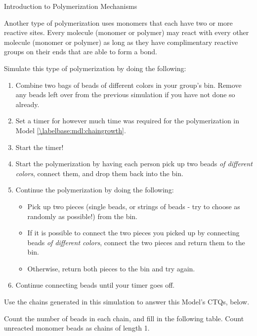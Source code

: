 \begin{activity}{Introduction to Polymerization Mechanisms}
\begin{model}
	Another type of polymerization uses monomers that each have two or more reactive sites.  Every molecule (monomer or polymer) may react with every other molecule (monomer or polymer) as long as they have complimentary reactive groups on their ends that are able to form a bond.
	
	Simulate this type of polymerization by doing the following:
	\begin{enumerate}
		\item Combine two bags of beads of different colors in your group's bin.  Remove any beads left over from the previous simulation if you have not done so already.
		\item Set a timer for however much time was required for the polymerization in Model \ref{\labelbase:mdl:chaingrowth}.
		\item Start the timer!
		\item Start the polymerization by having each person pick up two beads \emph{of different colors}, connect them, and drop them back into the bin.
		\item Continue the polymerization by doing the following:
			\begin{itemize}
				\item Pick up two pieces (single beads, or strings of beads - try to choose as randomly as possible!) from the bin.
				\item If it is possible to connect the two pieces you picked up by connecting beads \emph{of different colors}, connect the two pieces and return them to the bin.
				\item Otherwise, return both pieces to the bin and try again.
			\end{itemize}
		\item Continue connecting beads until your timer goes off.
	\end{enumerate}
	
	Use the chains generated in this simulation to answer this Model's CTQs, below.

\end{model}
	
\begin{ctqs}

	\question Count the number of beads in each chain, and fill in the following table.  Count unreacted monomer beads as chains of length 1. \label{\labelbase:ctq:numbeadsstep}
		

\end{ctqs}
\end{activity}
